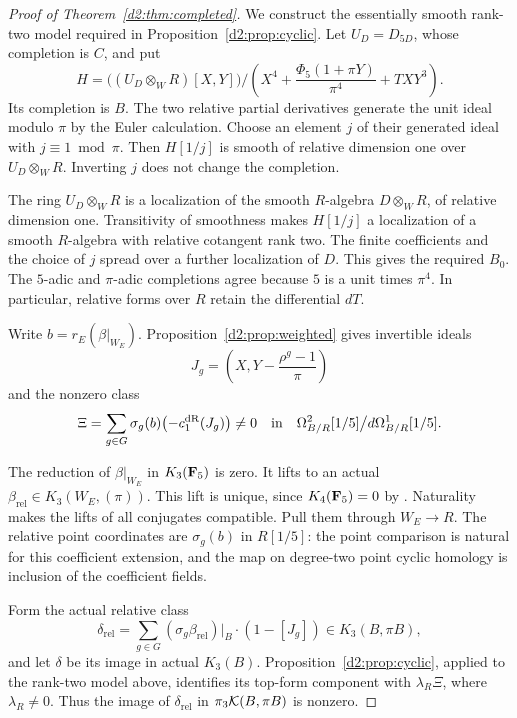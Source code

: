\begin{proof}[Proof of Theorem~\ref{d2:thm:completed}]
We construct the essentially smooth rank-two model required in
Proposition~\ref{d2:prop:cyclic}.
Let \(U_D=D_{5D}\), whose completion is \(C\), and put
\[
 H=
 \bigl((U_D\otimes_WR)[X,Y]\bigr)/
 \left(X^4+\frac{\Phi_5(1+\pi Y)}{\pi^4}+TXY^3\right).
\]
Its completion is \(B\).
The two relative partial derivatives generate the unit ideal
modulo \(\pi\) by the Euler calculation.
Choose an element \(j\) of their generated ideal with
\(j\equiv1\bmod\pi\).
Then \(H[1/j]\) is smooth of relative dimension one over
\(U_D\otimes_WR\).
Inverting \(j\) does not change the completion.

The ring \(U_D\otimes_WR\) is a localization of the smooth
\(R\)-algebra \(D\otimes_WR\), of relative dimension one.
Transitivity of smoothness makes \(H[1/j]\) a localization of a
smooth \(R\)-algebra with relative cotangent rank two.
The finite coefficients and the choice of \(j\) spread over a
further localization of \(D\).
This gives the required \(B_0\).
The \(5\)-adic and \(\pi\)-adic completions agree because \(5\)
is a unit times \(\pi^4\).
In particular, relative forms over \(R\) retain the differential
\(dT\).

Write \(b=r_E(\beta|_{W_E})\).
Proposition~\ref{d2:prop:weighted} gives invertible ideals
\[
 J_g=\left(X,Y-\frac{\rho^g-1}{\pi}\right)
\]
and the nonzero class
\begin{equation}\label{d2:eq:completed-form}
 \Xi=\sum_{g\in G}\sigma_g(b)\bigl(-c_1^{\mathrm{dR}}(J_g)\bigr)
 \ne0
 \quad\text{in}\quad
 \Omega^2_{B/R}[1/5]\big/d\Omega^1_{B/R}[1/5].
\end{equation}

The reduction of \(\beta|_{W_E}\) in \(K_3(\mathbf{F}_5)\) is zero.
It lifts to an actual
\(\beta_{\mathrm{rel}}\in K_3(W_E,(\pi))\).
This lift is unique, since \(K_4(\mathbf{F}_5)=0\) by
\cite{QuillenFinite}\cite[IV, Corollary~1.13]{Weibel}.
Naturality makes the lifts of all conjugates compatible.
Pull them through \(W_E\to R\).
The relative point coordinates are \(\sigma_g(b)\) in \(R[1/5]\):
the point comparison is natural for this coefficient extension,
and the map on degree-two point cyclic homology is inclusion of
the coefficient fields.

Form the actual relative class
\[
 \delta_{\mathrm{rel}}
   =\sum_{g\in G}
      (\sigma_g\beta_{\mathrm{rel}})|_B\cdot(1-[J_g])
       \in K_3(B,\pi B),
\]
and let \(\delta\) be its image in actual \(K_3(B)\).
Proposition~\ref{d2:prop:cyclic}, applied to the rank-two model above,
identifies its top-form component with \(\lambda_R\Xi\), where
\(\lambda_R\ne0\).
Thus the image of \(\delta_{\mathrm{rel}}\) in
\(\pi_3\mathcal K(B,\pi B)\) is nonzero.


\end{proof}

